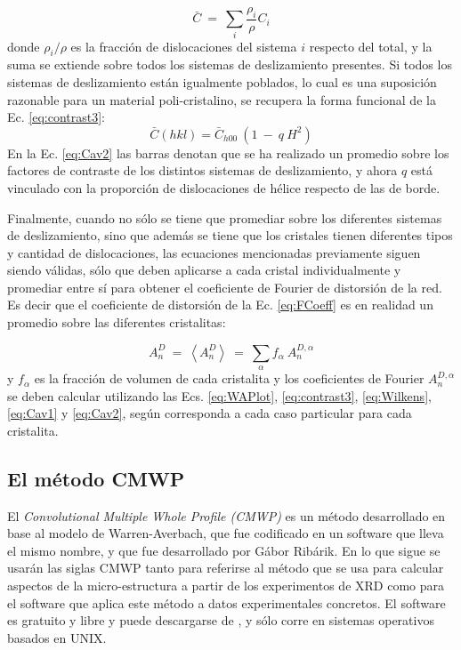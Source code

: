 \begin{equation}
  \bar{C} \ = \ \sum_i \frac{\rho_i}{\rho} C_i
  \label{eq:Cav1}
\end{equation}
\noindent
donde $\rho_i/\rho$ es la fracción de dislocaciones del sistema $i$ respecto del total, y la suma se extiende sobre todos los sistemas de deslizamiento presentes.
Si todos los sistemas de deslizamiento están igualmente poblados, lo cual es una suposición razonable para un material poli-cristalino, se recupera la forma funcional de la Ec. \ref{eq:contrast3}:
\begin{equation}
  \bar{C}(hkl) = \bar{C}_{h00}\ (1 \ - \ q\ H^2)
  \label{eq:Cav2}
\end{equation}
\noindent
En la Ec. \ref{eq:Cav2} las barras denotan que se ha realizado un promedio sobre los factores de contraste de los distintos sistemas de deslizamiento, y ahora $q$ está vinculado con la proporción de dislocaciones de hélice respecto de las de borde.

Finalmente, cuando no sólo se tiene que promediar sobre los diferentes sistemas de deslizamiento, sino que además se tiene que los cristales tienen diferentes tipos y cantidad de dislocaciones, las ecuaciones mencionadas previamente siguen siendo válidas, sólo que deben aplicarse a cada cristal individualmente y promediar entre sí para obtener el coeficiente de Fourier de distorsión de la red. Es decir que el coeficiente de distorsión de la Ec. \ref{eq:FCoeff} es en realidad un promedio sobre las diferentes cristalitas:

\begin{equation}
  A_n^D \ = \ \left< A_n^D \right> \ = \ \sum_{\alpha} f_{\alpha} \ A_{n}^{D,\alpha}
  \label{eq:FCoeffAv}
\end{equation}
\noindent
y $f_{\alpha}$ es la fracción de volumen de cada cristalita y los coeficientes de Fourier $A_{n}^{D,\alpha}$ se deben calcular utilizando las Ecs. \ref{eq:WAPlot}, \ref{eq:contrast3}, \ref{eq:Wilkens}, \ref{eq:Cav1} y \ref{eq:Cav2}, según corresponda a cada caso particular para cada cristalita.

\subsection{El método CMWP}\label{SS:CMWP}
El \textit{Convolutional Multiple Whole Profile (CMWP)} es un método desarrollado en base al modelo de Warren-Averbach, que fue codificado en un software que lleva el mismo nombre, y que fue desarrollado por Gábor Ribárik\cite{Ungar2001,Ribarik2001,Ribarik2008}. 
En lo que sigue se usarán las siglas CMWP tanto para referirse al método que se usa para calcular aspectos de la micro-estructura a partir de los experimentos de XRD como para el software que aplica este método a datos experimentales concretos.
El software es gratuito y libre y puede descargarse de \cite{cmwp:web}, y sólo corre en sistemas operativos basados en UNIX.

